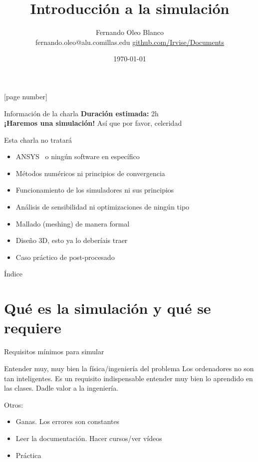 \documentclass[12pt]{beamer}
\begin{document}
	\author{Fernando Oleo Blanco \\ fernando.oleo@alu.comillas.edu \hfill 	\href{https://github.com/Irvise/Documents}{github.com/Irvise/Documents}}
	\title{Introducción a la simulación}
	\date{\today}
	[page number]
\begin{frame}[plain]
	\maketitle
\end{frame}

\begin{frame}{Información de la charla}
	\textbf{Duración estimada:} 2h \\
	\textbf{¡Haremos una simulación!} Así que por favor, celeridad
	
	\begin{block}{Esta charla no tratará}
		\begin{itemize}
			\item ANSYS \textregistered\ o ningún software en específico
			\item Métodos numéricos ni principios de convergencia
			\item Funcionamiento de los simuladores ni sus principios
			\item Análisis de sensibilidad ni optimizaciones de ningún tipo
			\item Mallado (meshing) de manera formal
			\item Diseño 3D, esto ya lo deberíais traer
			\item Caso práctico de post-procesado
		\end{itemize}
	\end{block}
\end{frame}

\begin{frame}{Índice}
	\setcounter{tocdepth}{2}
	\tableofcontents
\end{frame}

\section{Qué es la simulación y qué se requiere}

\begin{frame}{Requisitos mínimos para simular}
	\begin{block}{Entender muy, muy bien la física/ingeniería del problema}
		Los ordenadores no son tan inteligentes. Es un requisito indispensable entender muy bien lo aprendido en las clases. Dadle valor a la ingeniería.
	\end{block}
	Otros:
	\begin{itemize}
		\item Ganas. Los errores son constantes
		\item Leer la documentación. Hacer cursos/ver vídeos
		\item Práctica
	\end{itemize}
\end{frame}
\end{document}
